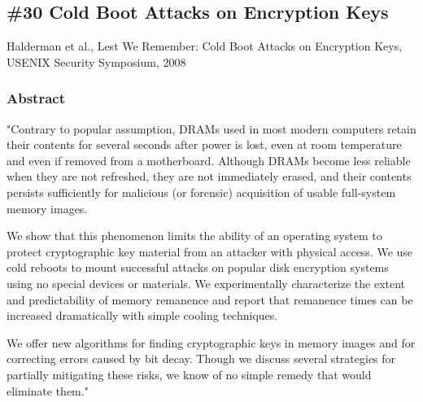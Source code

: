 \subsection{\#30 Cold Boot Attacks on Encryption Keys}
Halderman et al., Lest We Remember: Cold Boot Attacks on Encryption Keys, USENIX Security Symposium, 2008
\subsubsection{Abstract}
"Contrary to popular assumption, DRAMs used in most modern computers retain their contents for several seconds after power is lost,
even at room temperature and even if removed from a motherboard. Although DRAMs become less reliable when they are not refreshed,
they are not immediately erased, and their contents persists sufficiently for malicious (or forensic) acquisition of usable full-system
memory images.

We show that this phenomenon limits the ability of an operating system to protect cryptographic key material from an attacker
with physical access. We use cold reboots to mount successful attacks on popular disk encryption systems using no special devices or
materials. We experimentally characterize the extent and predictability of memory remanence and report that remanence times can be
increased dramatically with simple cooling techniques.

We offer new algorithms for finding cryptographic keys in memory images and for correcting errors caused by bit decay.
Though we discuss several strategies for partially mitigating these risks, we know of no simple remedy that would eliminate them."

